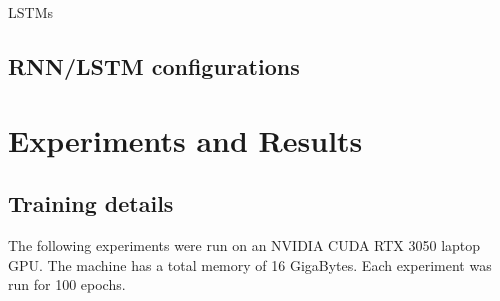 \documentclass[12pt, letterpaper]{article}
\begin{document}
LSTMs 

\subsection{RNN/LSTM configurations}

\section{Experiments and Results}


\subsection{Training details}

The following experiments were run on an NVIDIA CUDA RTX 3050 laptop GPU. The
machine has a total memory of 16 GigaBytes. Each experiment was run for 100 epochs.


\printbibliography
\end{document}
